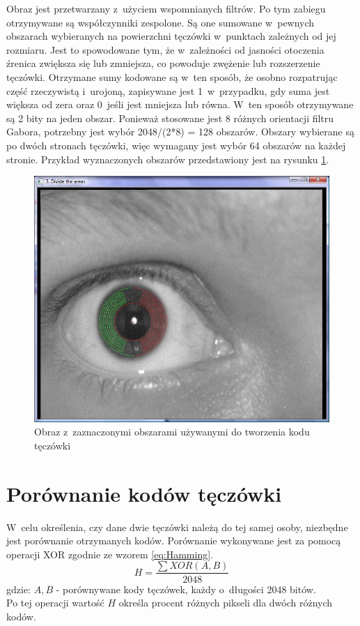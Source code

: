 Obraz jest przetwarzany z~użyciem wspomnianych filtrów. Po tym zabiegu otrzymywane są współczynniki zespolone. Są one sumowane w~pewnych obszarach wybieranych na powierzchni tęczówki w~punktach zależnych od jej rozmiaru. Jest to spowodowane tym, że w~zależności od jasności otoczenia źrenica zwiększa się lub zmniejsza, co powoduje zwężenie lub rozszerzenie tęczówki. Otrzymane sumy kodowane są w~ten sposób, że osobno rozpatrując część rzeczywistą i~urojoną, zapisywane jest 1~w~przypadku, gdy suma jest większa od zera oraz 0~jeśli jest mniejsza lub równa. W~ten sposób otrzymywane są 2 bity na jeden obszar. Ponieważ stosowane jest 8 różnych orientacji filtru Gabora, potrzebny jest wybór 2048/(2*8) = 128 obszarów. Obszary wybierane są po dwóch stronach tęczówki, więc wymagany jest wybór 64 obszarów na każdej stronie. Przykład wyznaczonych obszarów przedstawiony jest na rysunku \ref{fig:obszaryNasze}.

\begin{figure}
\begin{center}
\includegraphics[scale=0.5]{obszary.jpg}
\caption{Obraz z~zaznaczonymi obszarami używanymi do tworzenia kodu tęczówki}
\label{fig:obszaryNasze}
\end{center}
\end{figure}

\section{Porównanie kodów tęczówki}
\label{sec:porownanieKodow}
W~celu określenia, czy dane dwie tęczówki należą do tej samej osoby, niezbędne jest porównanie otrzymanych kodów. Porównanie wykonywane jest za pomocą operacji XOR zgodnie ze wzorem \ref{eq:Hamming}.
\begin{equation}
\label{eq:Hamming}
H = \frac{\sum XOR(A,B)}{2048}
\end{equation}
gdzie:
$A, B$ - porównywane kody tęczówek, każdy o~długości 2048 bitów.\\
Po tej operacji wartość $H$ określa procent różnych pikseli dla dwóch różnych kodów.


